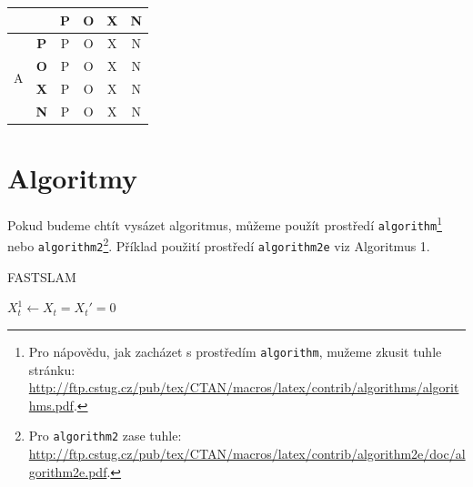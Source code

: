 \documentclass[11pt]{article}
\begin{document}
\begin{center}
\begin{tabular}{|c|c|c|c|c|c|}
            \cline{3-6}
            & & \textbf{P} & \textbf{O} & \textbf{X} & \textbf{N} \\
            \hline
            \multirow{4}{*}{A} & \textbf{P} & P & O & X & N \\
            \cline{2-6}
            & \textbf{O} & P & O & X & N \\
            \cline{2-6}
            & \textbf{X} & P & O & X & N \\
            \cline{2-6}
            & \textbf{N} & P & O & X & N \\
            \hline
        \end{tabular}
    \end{center}





    \section{Algoritmy}
    Pokud budeme chtít vysázet algoritmus, můžeme použít prostředí \verb|algorithm|\footnote[2]{Pro nápovědu,
        jak zacházet s prostředím \texttt{algorithm}, mužeme zkusit tuhle stránku: \href{http://ftp.cstug.cz/pub/tex/CTAN/macros/latex/contrib/algorithms/algorithms.pdf}{http://ftp.cstug.cz/pub/tex/CTAN/macros/latex/contrib/algorithms/algorithms.pdf}.} nebo \verb|algorithm2|\footnote[3]{Pro \texttt{algorithm2} zase tuhle: \href{http://ftp.cstug.cz/pub/tex/CTAN/macros/latex/contrib/algorithm2e/doc/algorithm2e.pdf}{http://ftp.cstug.cz/pub/tex/CTAN/macros/latex/contrib/algorithm2e/doc/algorithm2e.pdf}.}.
    Příklad použití prostředí \verb|algorithm2e| viz Algoritmus 1.

    \begin{algorithm}[H]
        \caption{FASTSLAM}
        \BlankLine
        $X_t^1 \leftarrow X_t = X_t' = 0$\;
        \;
    \end{algorithm}
\end{document}
